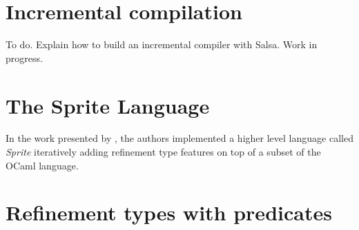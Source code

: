 \documentclass[
    oneside,
    english,
    embeddedlogo,
    noabntexcite
]{ufsc-thesis-rn46-2019}
\begin{document}


\section{Incremental compilation}

To do. Explain how to build an incremental compiler with Salsa. Work in progress.

\section{The Sprite Language}

In the work presented by \textcite{jhala2020tutorial}, the authors implemented a higher level language called \textit{Sprite} iteratively adding refinement type features on top of a subset of the OCaml language.

\section{Refinement types with predicates}
\end{document}

